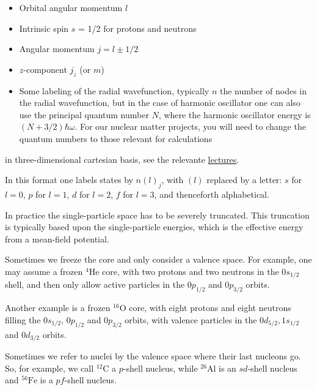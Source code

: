 \begin{itemize}
\item Orbital angular momentum $l$

\item Intrinsic spin $s$ = 1/2 for protons and neutrons

\item Angular momentum $j = l \pm 1/2$

\item $z$-component $j_z$ (or $m$)

\item Some labeling of the radial wavefunction, typically $n$ the number of nodes in  the radial wavefunction, but in the case of harmonic oscillator one can also use the principal quantum number $N$, where the harmonic oscillator energy is $(N+3/2)\hbar \omega$.  For our nuclear matter projects, you will need to change the quantum numbers to those relevant for calculations
\end{itemize}

\noindent
in three-dimensional cartesian basis, see the relevante \href{{https://github.com/NuclearTalent/Course2ManyBodyMethods/blob/master/doc/pub/cc/pdf/Lectures1-2_TALENT_NuclearMatter_GH.pdf}}{lectures}.


In this format one labels states by $n(l)_j$, with $(l)$ replaced by a letter:
$s$ for $l=0$, $p$ for $l=1$, $d$ for $l=2$, $f$ for $l=3$, and thenceforth alphabetical.


 In practice the single-particle space has to be severely truncated.  This truncation is 
typically based upon the single-particle energies, which is the effective energy 
from a mean-field potential. 

Sometimes we freeze the core and only consider a valence space. For example, one 
may assume a frozen ${}^{4}\mbox{He}$ core, with two protons and two neutrons in the $0s_{1/2}$ 
shell, and then only allow active particles in the $0p_{1/2}$ and $0p_{3/2}$ orbits. 


Another example is a frozen ${}^{16}\mbox{O}$ core, with eight protons and eight neutrons filling the 
$0s_{1/2}$,  $0p_{1/2}$ and $0p_{3/2}$ orbits, with valence particles in the 
$0d_{5/2}, 1s_{1/2}$ and $0d_{3/2}$ orbits.


Sometimes we refer to nuclei by the valence space where their last nucleons go.  
So, for example, we call ${}^{12}\mbox{C}$ a $p$-shell nucleus, while ${}^{26}\mbox{Al}$ is an 
$sd$-shell nucleus and ${}^{56}\mbox{Fe}$ is a $pf$-shell nucleus.





